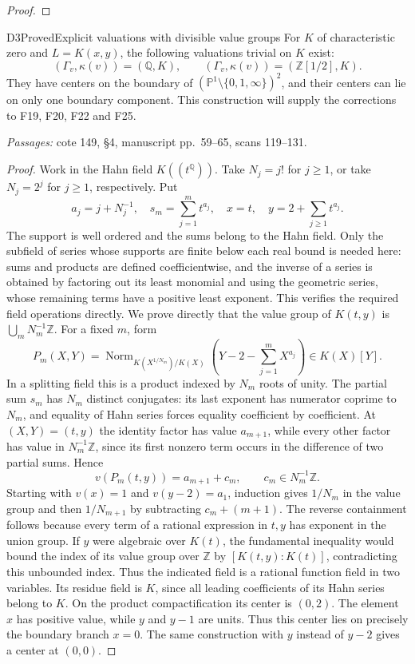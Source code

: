 \begin{proof}
\end{proof}

\begin{result}{D3}{Proved}{Explicit valuations with divisible value groups}
For $K$ of characteristic zero and $L=K(x,y)$, the following valuations trivial on $K$ exist:
\[
 (\Gamma_v,\kappa(v))=(\mathbb Q,K),\qquad
 (\Gamma_v,\kappa(v))=(\mathbb Z[1/2],K).
\]
They have centers on the boundary of $(\mathbb P^1\setminus\{0,1,\infty\})^2$, and their centers can lie on only one boundary component. This construction will supply the corrections to F19, F20, F22 and F25.
\par\emph{Passages:} cote 149, \S4, manuscript pp.~59--65, scans 119--131.
\end{result}
\begin{proof}
Work in the Hahn field $K((t^{\mathbb Q}))$. Take $N_j=j!$ for $j\ge1$, or take $N_j=2^j$ for $j\ge1$, respectively. Put
\[
 a_j=j+N_j^{-1},\quad s_m=\sum_{j=1}^m t^{a_j},\quad
 x=t,\quad y=2+\sum_{j\ge1}t^{a_j}.
\]
The support is well ordered and the sums belong to the Hahn field. Only the subfield of series whose supports are finite below each real bound is needed here: sums and products are defined coefficientwise, and the inverse of a series is obtained by factoring out its least monomial and using the geometric series, whose remaining terms have a positive least exponent. This verifies the required field operations directly. We prove directly that the value group of $K(t,y)$ is $\bigcup_mN_m^{-1}\mathbb Z$. For a fixed $m$, form
\[
 P_m(X,Y)=\operatorname{Norm}_{K(X^{1/N_m})/K(X)}
 \left(Y-2-\sum_{j=1}^mX^{a_j}\right)\in K(X)[Y].
\]
In a splitting field this is a product indexed by $N_m$ roots of unity. The partial sum $s_m$ has $N_m$ distinct conjugates: its last exponent has numerator coprime to $N_m$, and equality of Hahn series forces equality coefficient by coefficient. At $(X,Y)=(t,y)$ the identity factor has value $a_{m+1}$, while every other factor has value in $N_m^{-1}\mathbb Z$, since its first nonzero term occurs in the difference of two partial sums. Hence
\[
 v(P_m(t,y))=a_{m+1}+c_m,\qquad c_m\in N_m^{-1}\mathbb Z.
\]
Starting with $v(x)=1$ and $v(y-2)=a_1$, induction gives $1/N_m$ in the value group and then $1/N_{m+1}$ by subtracting $c_m+(m+1)$. The reverse containment follows because every term of a rational expression in $t,y$ has exponent in the union group. If $y$ were algebraic over $K(t)$, the fundamental inequality would bound the index of its value group over $\mathbb Z$ by $[K(t,y):K(t)]$, contradicting this unbounded index. Thus the indicated field is a rational function field in two variables. Its residue field is $K$, since all leading coefficients of its Hahn series belong to $K$.
On the product compactification its center is $(0,2)$. The element $x$ has positive value, while $y$ and $y-1$ are units. Thus this center lies on precisely the boundary branch $x=0$. The same construction with $y$ instead of $y-2$ gives a center at $(0,0)$.
\end{proof}

